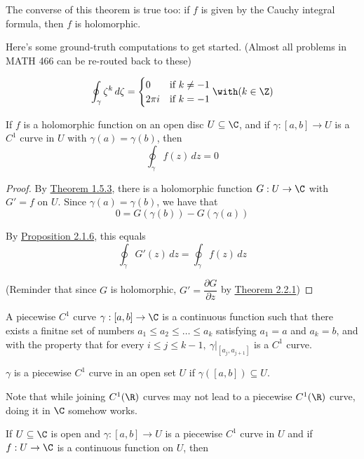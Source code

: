 The converse of this theorem is true too: if $f$ is given by the Cauchy
integral formula, then $f$ is holomorphic.

\label{da0d68d}

Here's some ground-truth computations to get started. (Almost all problems in
MATH 466 can be re-routed back to these)

$$
  \oint_\gamma\zeta^k\,d\zeta=\begin{cases}
    0      & \text{if }k\neq-1 \\
    2\pi i & \text{if }k=-1
  \end{cases}\with(k\in\Z)
$$

\label{fb87a78}

If $f$ is a holomorphic function on an open disc $U\subseteq\C$, and if
$\gamma:[a,b]\to U$ is a $C^1$ curve in $U$ with $\gamma(a)=\gamma(b)$, then
$$\oint_\gamma f(z)\,dz=0$$

\begin{proof}
  By \href{e7808d1}{Theorem 1.5.3}, there is a holomorphic function
  $G:U\to\C$ with $G'=f$ on $U$. Since $\gamma(a)=\gamma(b)$, we have
  that
  $$
    0=G(\gamma(b))-G(\gamma(a))
  $$

  By \href{c526c09}{Proposition 2.1.6}, this equals
  $$\oint_\gamma G'(z)\,dz=\oint_\gamma f(z)\,dz$$

  (Reminder that since $G$ is holomorphic, $G'=\dfrac{\partial
    G}{\partial z}$ by \href{f75e43c}{Theorem 2.2.1})
\end{proof}

\label{baf22ac}

A piecewise $C^1$ curve $\gamma:[a,b]\to\C$ is a continuous function such that
there exists a finitne set of numbers $a_1\leq a_2\leq\ldots\leq a_k$
satisfying $a_1=a$ and $a_k=b$, and with the property that for every $i\leq
j\leq k-1,\ \gamma|_{[a_j,a_{j+1}]}$ is a $C^1$ curve.

$\gamma$ is a piecewise $C^1$ curve in an open set $U$ if
$\gamma([a,b])\subseteq U$.

Note that while joining $C^1(\R)$ curves may not lead to a piecewise $C^1(\R)$
curve, doing it in $\C$ somehow works.

\label{a99ad34}

If $U\subseteq\C$ is open and $\gamma:[a,b]\to U$ is a piecewise $C^1$ curve in
$U$ and if $f:U\to\C$ is a continuous function on $U$, then

